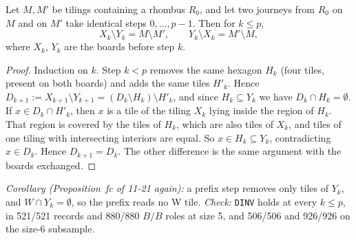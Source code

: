 \documentclass[11pt]{article}
\theoremstyle{definition}\newtheorem{definition}[theorem]{Definition}\newtheorem{remark}[theorem]{Remark}
\begin{document}
\begin{lemma}\label{lem:dinv}
Let $M,M'$ be tilings containing a rhombus $R_0$, and let two journeys from $R_0$ on $M$ and on $M'$ take identical steps $0,\dots,p-1$. Then for $k\le p$,
\[X_k\setminus Y_k=M\setminus M',\qquad Y_k\setminus X_k=M'\setminus M,\]
where $X_k$, $Y_k$ are the boards before step $k$.
\end{lemma}
\begin{proof}
Induction on $k$. Step $k<p$ removes the same hexagon $H_k$ (four tiles, present on both boards) and adds the same tiles $H'_k$. Hence $D_{k+1}:=X_{k+1}\setminus Y_{k+1}=(D_k\setminus H_k)\setminus H'_k$, and since $H_k\subseteq Y_k$ we have $D_k\cap H_k=\emptyset$.
If $x\in D_k\cap H'_k$, then $x$ is a tile of the tiling $X_k$ lying inside the region of $H_k$. That region is covered by the tiles of $H_k$, which are also tiles of $X_k$, and tiles of one tiling with intersecting interiors are equal. So $x\in H_k\subseteq Y_k$, contradicting $x\in D_k$. Hence $D_{k+1}=D_k$. The other difference is the same argument with the boards exchanged.
\end{proof}
\noindent\emph{Corollary (Proposition~fc of 11-21 again):} a prefix step removes only tiles of $Y_k$, and $W\cap Y_k=\emptyset$, so the prefix reads no W tile.
\emph{Check:} \texttt{DINV} holds at every $k\le p$, in 521/521 records and 880/880 $B/B$ roles at size 5, and 506/506 and 926/926 on the size-6 subsample.
\end{document}
